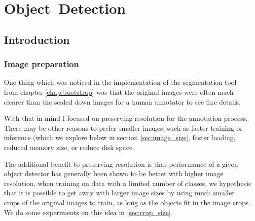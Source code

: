 \chapter{Object~Detection}
\label{chap:detection} 


\section{Introduction}


\subsection {Image preparation}

One thing which was noticed in the implementation of the segmentation tool from chapter \ref{chap:bootstrap} was that the original images were often much clearer than the scaled down images for a human annotator to see fine details.

With that in mind I focused on preserving resolution for the annotation process. There may be other reasons to prefer smaller images, such as faster training or inference (which we explore below in section \ref{sec:image_size}, faster loading, reduced memory size, or reduce disk space. 

The additional benefit to preserving resolution is that performance of a given object detector has generally been shown to be better with higher image resolution, when training on data with a limited number of classes, we hypothesis that it is possible to get away with larger image sizes by using much smaller crops of the original images to train, as long as the objects fit in the image crops. We do some experiments on this idea in \ref{sec:crop_size}.

